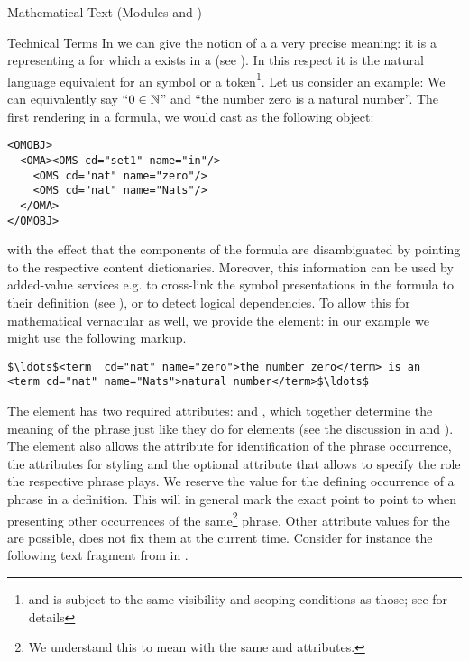 \begin{tchapter}[id=mtxt,short=Mathematical Text]{Mathematical Text (Modules
  {} and {})}
\begin{tsection}[id=terms]{Technical Terms}
  In {\omdoc} we can give the notion of a {} a very precise
  meaning: it is a {} representing a {} for which a
  {} exists in a {} (see
  {}). In this respect it is the natural language equivalent for
  an {\openmath} symbol or a {\cmathml} token\footnote{and is subject to the same
    visibility and scoping conditions as those; see {} for
    details}. Let us consider an example: We can equivalently say ``$0\in{\mathbb{N}}$'' and ``the
  number zero is a natural number''. The first rendering in a formula, we would cast as
  the following {\openmath} object:
\begin{lstlisting}[language=OpenMath,numbers=none]
<OMOBJ>
  <OMA><OMS cd="set1" name="in"/>
    <OMS cd="nat" name="zero"/>
    <OMS cd="nat" name="Nats"/>
  </OMA>
</OMOBJ>
\end{lstlisting}
  with the effect that the components of the formula are disambiguated by pointing to the
  respective content dictionaries. Moreover, this information can be used by added-value
  services e.g. to cross-link the symbol presentations in the formula to their definition
  (see {}), or to detect logical dependencies. To allow this for
  mathematical vernacular as well, we provide the {} element: in our example
  we might use the following markup.
\begin{lstlisting}[language=OpenMath,numbers=none,mathescape]
$\ldots$<term  cd="nat" name="zero">the number zero</term> is an 
<term cd="nat" name="Nats">natural number</term>$\ldots$
\end{lstlisting}
The {} element has two required attributes: {} and
{}, which together determine the meaning of the phrase just like
they do for {} elements (see the discussion in
{} and {}). The {} element also
allows the attribute {} for identification of the phrase
occurrence, the {\css} attributes for styling and the optional
{} attribute that allows to specify the role the respective phrase
plays. We reserve the value {} for the defining occurrence
of a phrase in a definition.  This will in general mark the exact point to point to when
presenting other occurrences of the same\footnote{We understand this to mean with the same
  {} and {} attributes.} phrase. Other attribute
values for the {} are possible, {\omdoc} does not fix them at the
current time.  Consider for instance the following text fragment from
{} in {}.


\end{tsection}
\end{tchapter}
